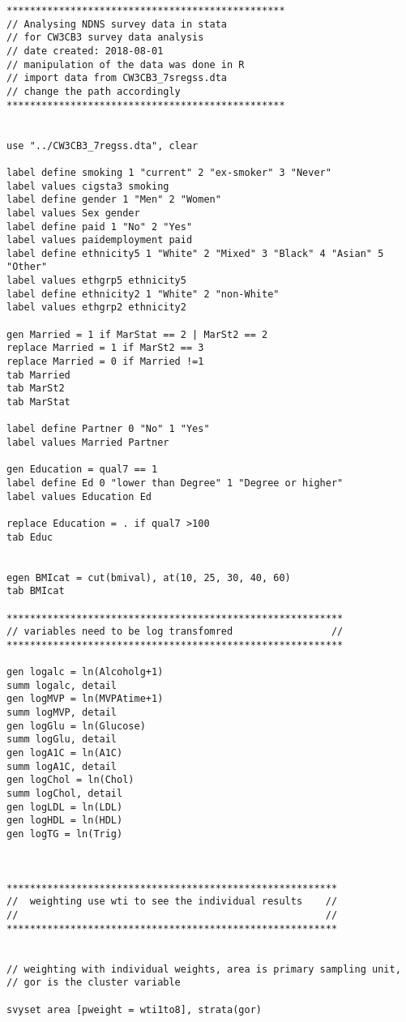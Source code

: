 \documentclass[]{article}
\begin{document}
\begin{verbatim}
************************************************
// Analysing NDNS survey data in stata
// for CW3CB3 survey data analysis 
// date created: 2018-08-01
// manipulation of the data was done in R
// import data from CW3CB3_7sregss.dta
// change the path accordingly
************************************************


use "../CW3CB3_7regss.dta", clear

label define smoking 1 "current" 2 "ex-smoker" 3 "Never"
label values cigsta3 smoking
label define gender 1 "Men" 2 "Women"
label values Sex gender
label define paid 1 "No" 2 "Yes"
label values paidemployment paid
label define ethnicity5 1 "White" 2 "Mixed" 3 "Black" 4 "Asian" 5 "Other"
label values ethgrp5 ethnicity5
label define ethnicity2 1 "White" 2 "non-White"
label values ethgrp2 ethnicity2

gen Married = 1 if MarStat == 2 | MarSt2 == 2 
replace Married = 1 if MarSt2 == 3
replace Married = 0 if Married !=1
tab Married
tab MarSt2
tab MarStat

label define Partner 0 "No" 1 "Yes"
label values Married Partner

gen Education = qual7 == 1
label define Ed 0 "lower than Degree" 1 "Degree or higher"
label values Education Ed

replace Education = . if qual7 >100
tab Educ


egen BMIcat = cut(bmival), at(10, 25, 30, 40, 60)
tab BMIcat

**********************************************************
// variables need to be log transfomred                 //
**********************************************************

gen logalc = ln(Alcoholg+1)
summ logalc, detail
gen logMVP = ln(MVPAtime+1)
summ logMVP, detail
gen logGlu = ln(Glucose)
summ logGlu, detail
gen logA1C = ln(A1C)
summ logA1C, detail
gen logChol = ln(Chol)
summ logChol, detail
gen logLDL = ln(LDL)
gen logHDL = ln(HDL)
gen logTG = ln(Trig)



*********************************************************
//  weighting use wti to see the individual results    //
//                                                     //
*********************************************************


// weighting with individual weights, area is primary sampling unit, 
// gor is the cluster variable

svyset area [pweight = wti1to8], strata(gor)


\end{verbatim}
\end{document}
